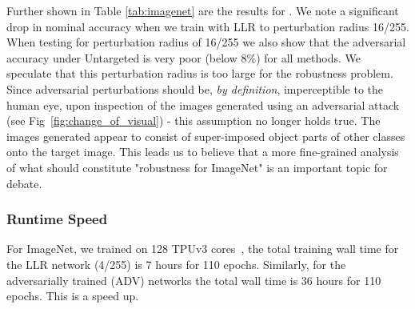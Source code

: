 \documentclass{article}
\theoremstyle{plain}
\theoremstyle{definition}
\theoremstyle{remark}
\begin{document}
Further shown in Table \ref{tab:imagenet} are the results for . We note a significant drop in nominal accuracy when we train with LLR to perturbation radius 16/255. When testing for perturbation radius of 16/255 we also show that the adversarial accuracy under Untargeted is very poor (below 8\%) for all methods. We speculate that this perturbation radius is too large  for the robustness problem. Since adversarial perturbations should be, {\it by definition}, imperceptible to the human eye, upon inspection of the images generated using an adversarial attack (see Fig~\ref{fig:change_of_visual}) - this assumption no longer holds true. The images generated appear to consist of super-imposed object parts of other classes onto the target image. This leads us to believe that a more fine-grained analysis of what should constitute "robustness for ImageNet" is an important topic for debate. 
\vspace{-0.1cm}
\subsubsection{Runtime Speed}\label{sec:compute}
For ImageNet, we trained on 128 TPUv3 cores~\citep{tpu}, the total training wall time for the LLR network (4/255) is 7 hours for 110 epochs. Similarly, for the adversarially trained (ADV) networks the total wall time is 36 hours for 110 epochs. This is a  speed up.
\vspace{-0.1cm}
\end{document}
